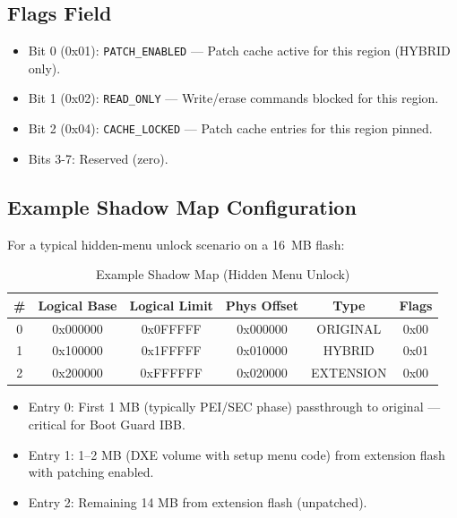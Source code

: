 \subsection{Flags Field}
\begin{itemize}
    \item Bit 0 (0x01): \texttt{PATCH\_ENABLED} — Patch cache active for this region (HYBRID only).
    \item Bit 1 (0x02): \texttt{READ\_ONLY} — Write/erase commands blocked for this region.
    \item Bit 2 (0x04): \texttt{CACHE\_LOCKED} — Patch cache entries for this region pinned.
    \item Bits 3-7: Reserved (zero).
\end{itemize}

\subsection{Example Shadow Map Configuration}
For a typical hidden-menu unlock scenario on a \SI{16}{MB} flash:

\begin{table}[h]
\centering
\caption{Example Shadow Map (Hidden Menu Unlock)}
\label{tab:shadow_example}
\begin{tabular}{@{}cccccc@{}}
\toprule
\textbf{\#} & \textbf{Logical Base} & \textbf{Logical Limit} & \textbf{Phys Offset} & \textbf{Type} & \textbf{Flags} \\
\midrule
0 & 0x000000 & 0x0FFFFF & 0x000000 & ORIGINAL & 0x00 \\
1 & 0x100000 & 0x1FFFFF & 0x010000 & HYBRID   & 0x01 \\
2 & 0x200000 & 0xFFFFFF & 0x020000 & EXTENSION & 0x00 \\
\bottomrule
\end{tabular}
\end{table}

\begin{itemize}
    \item Entry 0: First 1 MB (typically PEI/SEC phase) passthrough to original — critical for Boot Guard IBB.
    \item Entry 1: 1--2 MB (DXE volume with setup menu code) from extension flash with patching enabled.
    \item Entry 2: Remaining 14 MB from extension flash (unpatched).
\end{itemize}

